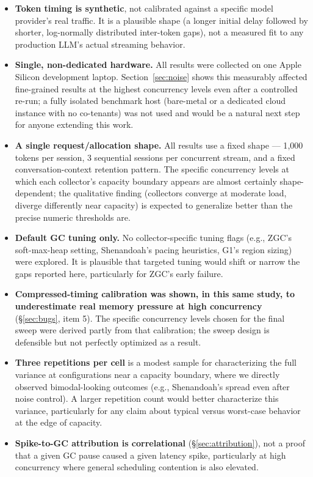 \documentclass[11pt]{article}
\begin{document}
\begin{itemize}[leftmargin=1.5em]
  \item \textbf{Token timing is synthetic}, not calibrated against a specific model provider's
    real traffic. It is a plausible shape (a longer initial delay followed by shorter,
    log-normally distributed inter-token gaps), not a measured fit to any production LLM's actual
    streaming behavior.
  \item \textbf{Single, non-dedicated hardware.} All results were collected on one Apple Silicon
    development laptop. Section~\ref{sec:noise} shows this measurably affected fine-grained
    results at the highest concurrency levels even after a controlled re-run; a fully isolated
    benchmark host (bare-metal or a dedicated cloud instance with no co-tenants) was not used and
    would be a natural next step for anyone extending this work.
  \item \textbf{A single request/allocation shape.} All results use a fixed shape --- 1{,}000
    tokens per session, 3 sequential sessions per concurrent stream, and a fixed
    conversation-context retention pattern. The specific concurrency levels at which each
    collector's capacity boundary appears are almost certainly shape-dependent; the qualitative
    finding (collectors converge at moderate load, diverge differently near capacity) is expected
    to generalize better than the precise numeric thresholds are.
  \item \textbf{Default GC tuning only.} No collector-specific tuning flags (e.g., ZGC's
    soft-max-heap setting, Shenandoah's pacing heuristics, G1's region sizing) were explored. It
    is plausible that targeted tuning would shift or narrow the gaps reported here, particularly
    for ZGC's early failure.
  \item \textbf{Compressed-timing calibration was shown, in this same study, to underestimate
    real memory pressure at high concurrency} (\S\ref{sec:bugs}, item 5). The specific
    concurrency levels chosen for the final sweep were derived partly from that calibration; the
    sweep design is defensible but not perfectly optimized as a result.
  \item \textbf{Three repetitions per cell} is a modest sample for characterizing the full
    variance at configurations near a capacity boundary, where we directly observed
    bimodal-looking outcomes (e.g., Shenandoah's spread even after noise control). A larger
    repetition count would better characterize this variance, particularly for any claim about
    typical versus worst-case behavior at the edge of capacity.
  \item \textbf{Spike-to-GC attribution is correlational} (\S\ref{sec:attribution}), not a proof
    that a given GC pause caused a given latency spike, particularly at high concurrency where
    general scheduling contention is also elevated.
\end{itemize}
\end{document}
